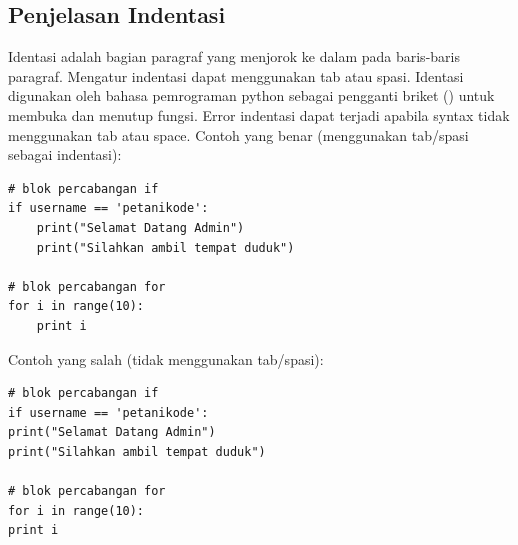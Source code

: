 \subsection{Penjelasan Indentasi}
Identasi adalah bagian paragraf yang menjorok ke dalam pada baris-baris paragraf. Mengatur indentasi dapat menggunakan tab atau spasi. Identasi digunakan oleh bahasa pemrograman python sebagai pengganti briket ({}) untuk membuka dan menutup fungsi. Error indentasi dapat terjadi apabila syntax tidak menggunakan tab atau space.
Contoh yang benar (menggunakan tab/spasi sebagai indentasi):
\begin{verbatim}
# blok percabangan if
if username == 'petanikode':
    print("Selamat Datang Admin")
    print("Silahkan ambil tempat duduk")

# blok percabangan for
for i in range(10):
    print i
\end{verbatim}
Contoh yang salah (tidak menggunakan tab/spasi):
\begin{verbatim}
# blok percabangan if
if username == 'petanikode':
print("Selamat Datang Admin")
print("Silahkan ambil tempat duduk")

# blok percabangan for
for i in range(10):
print i
\end{verbatim}

